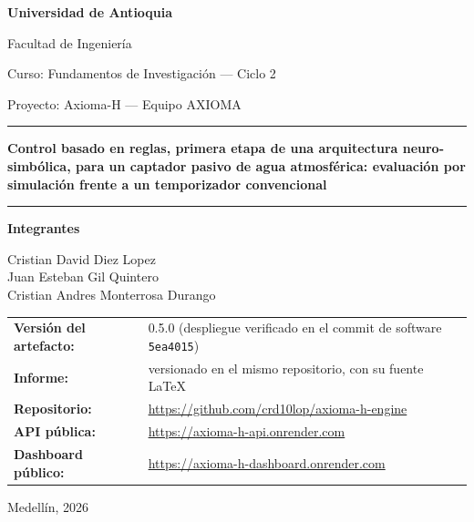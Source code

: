 \begin{titlepage}
\centering
\vspace*{1cm}

{\Large\bfseries Universidad de Antioquia\par}
\vspace{0.3cm}
{\large Facultad de Ingenier\'ia\par}
\vspace{0.3cm}
{\normalsize Curso: Fundamentos de Investigaci\'on --- Ciclo 2\par}
{\normalsize Proyecto: Axioma-H --- Equipo AXIOMA\par}

\vspace{2cm}
\rule{\textwidth}{1pt}
\vspace{0.5cm}

{\LARGE\bfseries Control basado en reglas, primera etapa de una arquitectura neuro-simb\'olica, para un captador pasivo de agua atmosf\'erica: evaluaci\'on por simulaci\'on frente a un temporizador convencional\par}

\vspace{0.5cm}
\rule{\textwidth}{1pt}

\vspace{2cm}
{\large\bfseries Integrantes\par}
\vspace{0.4cm}
{\large
Cristian David Diez Lopez\\[0.2cm]
Juan Esteban Gil Quintero\\[0.2cm]
Cristian Andres Monterrosa Durango\par
}

\vfill

\begin{tabular}{@{}ll@{}}
\textbf{Versi\'on del artefacto:} & 0.5.0 (despliegue verificado en el commit de software \texttt{5ea4015}) \\
\textbf{Informe:} & versionado en el mismo repositorio, con su fuente \LaTeX{} \\
\textbf{Repositorio:} & \url{https://github.com/crd10lop/axioma-h-engine} \\
\textbf{API p\'ublica:} & \url{https://axioma-h-api.onrender.com} \\
\textbf{Dashboard p\'ublico:} & \url{https://axioma-h-dashboard.onrender.com} \\
\end{tabular}

\vspace{1.2cm}
{\normalsize Medell\'in, 2026\par}
\end{titlepage}

